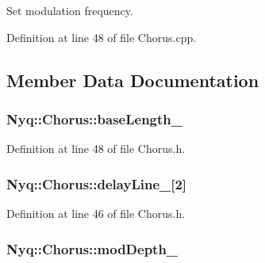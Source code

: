 Set modulation frequency. 



Definition at line 48 of file Chorus.\+cpp.



\subsection{Member Data Documentation}
\subsubsection[{\texorpdfstring{base\+Length\+\_\+}{baseLength_}}]{ Nyq\+::\+Chorus\+::base\+Length\+\_\+\hspace{0.3cm}{\ttfamily [protected]}}\hypertarget{class_nyq_1_1_chorus_a1ec1ed2be02d5ef00f048a59a9984eea}{}\label{class_nyq_1_1_chorus_a1ec1ed2be02d5ef00f048a59a9984eea}


Definition at line 48 of file Chorus.\+h.

\subsubsection[{\texorpdfstring{delay\+Line\+\_\+}{delayLine_}}]{ Nyq\+::\+Chorus\+::delay\+Line\+\_\+\mbox{[}2\mbox{]}\hspace{0.3cm}{\ttfamily [protected]}}\hypertarget{class_nyq_1_1_chorus_a0baa6d1fbb49ef1cbed4a36e64fc53a9}{}\label{class_nyq_1_1_chorus_a0baa6d1fbb49ef1cbed4a36e64fc53a9}


Definition at line 46 of file Chorus.\+h.

\subsubsection[{\texorpdfstring{mod\+Depth\+\_\+}{modDepth_}}]{ Nyq\+::\+Chorus\+::mod\+Depth\+\_\+\hspace{0.3cm}{\ttfamily [protected]}}\hypertarget{class_nyq_1_1_chorus_a53d13b8e362c2f0c2e8d97ceaf053953}{}\label{class_nyq_1_1_chorus_a53d13b8e362c2f0c2e8d97ceaf053953}


